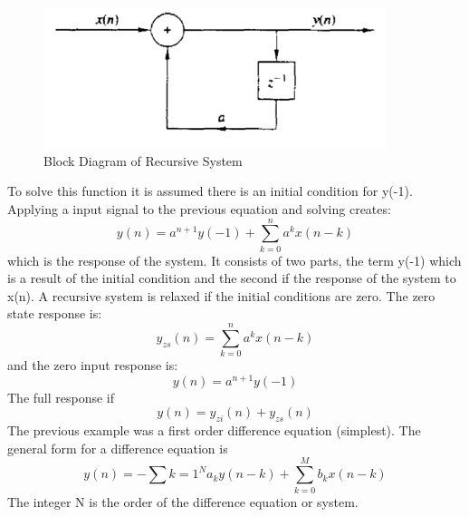 \documentclass{article} %
\begin{document}
	\begin{figure}[h]
    \centering
	\includegraphics[width=10cm]{feed}
	\caption{Block Diagram of Recursive System}
	\end{figure}
	To solve this function it is assumed there is an initial condition for y(-1). Applying a input signal to the previous equation and solving creates:
	\begin{equation}
 	y(n) = a^{n+1}y(-1) + \sum_{k=0}^{n}a^kx(n-k)
	\end{equation}
	which is the response of the system. It consists of two parts, the term y(-1) which is a result of the initial condition and the second if the response of the system to x(n). A recursive system is relaxed if the initial conditions are zero. The zero state response is:
	\begin{equation}
 	y_{zs}(n) = \sum_{k=0}^{n}a^kx(n-k)
	\end{equation}
	and the zero input response is:
	\begin{equation}
 	y(n) = a^{n+1}y(-1)
	\end{equation}
	The full response if 
	\begin{equation}
 	y(n) = y_{zi}(n) + y_{zs}(n)
	\end{equation}
	The previous example was a first order difference equation (simplest). The general form for a difference equation is 
	\begin{equation}
 	y(n) = -\sum{k=1}^N a_ky(n-k) + \sum_{k=0}^{M}b_k x(n-k)
	\end{equation}
	The integer N is the order of the difference equation or system.
	
\end{document}
